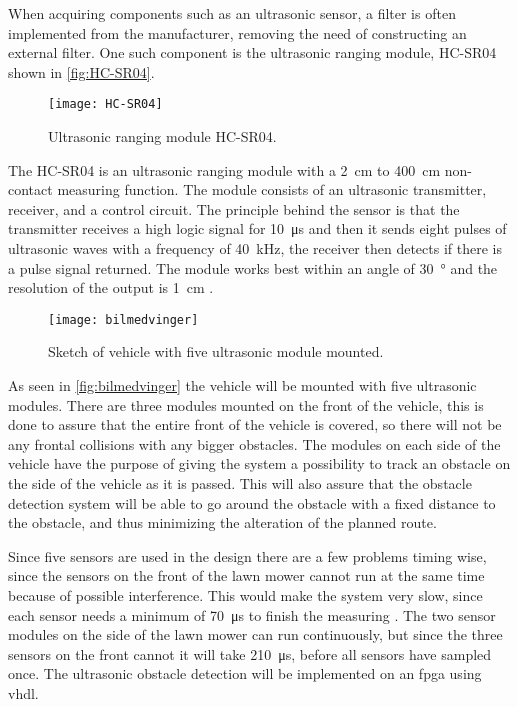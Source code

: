 When acquiring components such as an ultrasonic sensor, a filter is often implemented from the manufacturer, removing the need of constructing an external filter. One such component is the ultrasonic ranging module, HC-SR04 shown in \autoref{fig:HC-SR04}.

\begin{figure}[h!]%
	\centering
	\texttt{[image: HC-SR04]}
	\caption{Ultrasonic ranging module HC-SR04.}
	\label{fig:HC-SR04}%
\end{figure}

The HC-SR04 is an ultrasonic ranging module with a \SI{2}{\centi\meter} to \SI{400}{\centi\meter} non-contact measuring function. The module consists of an ultrasonic transmitter, receiver, and a control circuit. The principle behind the sensor is that the transmitter receives a high logic signal for \SI{10}{\micro\second} and then it sends eight pulses of ultrasonic waves with a frequency of \SI{40}{\kilo\hertz}, the receiver then detects if there is a pulse signal returned. The module works best within an angle of \SI{30}{\degree} and  the resolution of the output is \SI{1}{\centi\meter} \citep{HC-SR04}.

\begin{figure}[h!]%
	\centering
	\texttt{[image: bilmedvinger]}
	\caption{Sketch of vehicle with five ultrasonic module mounted.}
	\label{fig:bilmedvinger}
\end{figure}

As seen in \autoref{fig:bilmedvinger} the vehicle will be mounted with five ultrasonic modules. There are three modules mounted on the front of the vehicle, this is done to assure that the entire front of the vehicle is covered, so there will not be any frontal collisions with any bigger obstacles. The modules on each side of the vehicle have the purpose of giving the system a possibility to track an obstacle on the side of the vehicle as it is passed. This will also assure that the obstacle detection system will be able to go around the obstacle with a fixed distance to the obstacle, and thus minimizing the alteration of the planned route.

Since five sensors are used in the design there are a few problems timing wise, since the sensors on the front of the lawn mower cannot run at the same time because of possible interference. This would make the system very slow, since each sensor needs a minimum of \SI{70}{\micro\second} to finish the measuring \citep{HC-SR04}. The two sensor modules on the side of the lawn mower can run continuously, but since the three sensors on the front cannot it will take \SI{210}{\micro\second}, before all sensors have sampled once. The ultrasonic obstacle detection will be implemented on an \gls{fpga} using \gls{vhdl}.

